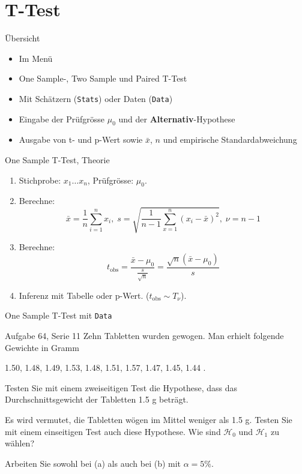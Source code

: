 \documentclass[handout]{beamer}
\newlength{\tikey}
\newcommand{\keystroke}[1]{\settowidth{\tikey}{\scriptsize #1}\psframebox[framearc=0.2]{\parbox{\tikey}{\scriptsize #1}}}
\begin{document}
\section{T-Test}
\begin{frame}{Übersicht}
\begin{itemize}
\item Im Menü \keystroke{F6}
\item One Sample-, Two Sample und Paired T-Test
\item Mit Schätzern (\texttt{Stats}) oder Daten (\texttt{Data})
\item Eingabe der Prüfgrösse $\mu_0$ und der \textbf{Alternativ}-Hypothese
\item Ausgabe von t- und p-Wert sowie $\bar{x}$, $n$ und empirische Standardabweichung
\end{itemize}
\end{frame}

\begin{frame}{One Sample T-Test, Theorie}
\begin{enumerate}
\item Stichprobe: $x_1\ldots x_n$, Prüfgrösse: $\mu_0$.
\item Berechne:
$$
\bar{x}=\frac{1}{n}\sum_{i=1}^n x_i,\;
s=\sqrt{\frac{1}{n-1}\sum_{x=1}^{n}(x_i-\bar{x})^2},\;
\nu=n-1
$$
\item Berechne:
$$
t_\text{obs}=\frac{\bar{x}-\mu_0}{\frac{s}{\sqrt{n}}} = 
\frac{\sqrt{n}\left(\bar{x}-\mu_0\right)}{s}
$$
\item Inferenz mit Tabelle oder p-Wert. ($t_\text{obs}\sim T_\nu$).
\end{enumerate}
\end{frame}

\begin{frame}{One Sample T-Test mit \texttt{Data}}
\begin{beamerboxesrounded}[shadow]{Aufgabe 64, Serie 11}
Zehn Tabletten wurden gewogen. Man erhielt folgende Gewichte in Gramm

\begin{center}
1.50, 1.48, 1.49, 1.53, 1.48, 1.51, 1.57, 1.47, 1.45, 1.44 .
\end{center}

\begin{outline}
\item Testen Sie mit einem zweiseitigen Test die Hypothese, dass das
Durchschnittsgewicht der Tabletten 1.5 g beträgt.
\item Es  wird vermutet, die Tabletten wögen im Mittel weniger als 1.5 g. Testen Sie
mit einem einseitigen Test auch diese Hypothese. Wie sind $\mathcal{H}_0$ und 
$\mathcal{H}_1$ zu wählen?
\end{outline}
Arbeiten Sie sowohl bei (a) als auch bei (b) mit $\alpha = 5\%$.
\end{beamerboxesrounded}
\end{frame}
\end{document}
